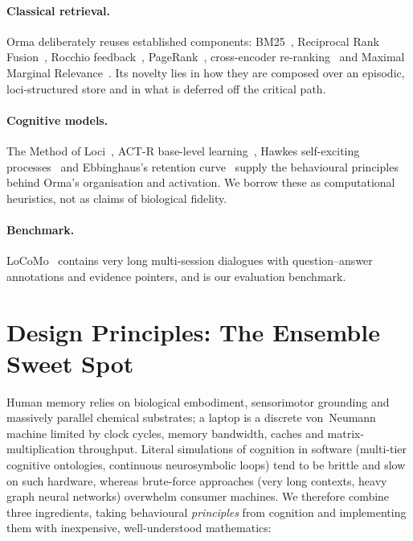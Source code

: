 \documentclass[11pt]{article}
\newcommand{\orma}{\mbox{Orma}}
\begin{document}
\paragraph{Classical retrieval.}
\orma{} deliberately reuses established components: BM25~\cite{robertson2009bm25}, Reciprocal Rank Fusion~\cite{cormack2009rrf}, Rocchio feedback~\cite{rocchio1971relevance}, PageRank~\cite{page1999pagerank}, cross-encoder re-ranking~\cite{nogueira2019passage,jiao2020tinybert} and Maximal Marginal Relevance~\cite{carbonell1998mmr}.
Its novelty lies in how they are composed over an episodic, loci-structured store and in what is deferred off the critical path.

\paragraph{Cognitive models.}
The Method of Loci~\cite{yates1966art}, ACT-R base-level learning~\cite{anderson1998actr}, Hawkes self-exciting processes~\cite{hawkes1971spectra} and Ebbinghaus's retention curve~\cite{ebbinghaus1885memory} supply the behavioural principles behind \orma's organisation and activation. We borrow these as computational heuristics, not as claims of biological fidelity.

\paragraph{Benchmark.}
LoCoMo~\cite{maharana2024locomo} contains very long multi-session dialogues with question--answer annotations and evidence pointers, and is our evaluation benchmark.

\section{Design Principles: The Ensemble Sweet Spot}
\label{sec:principles}

Human memory relies on biological embodiment, sensorimotor grounding and massively parallel chemical substrates; a laptop is a discrete von~Neumann machine limited by clock cycles, memory bandwidth, caches and matrix-multiplication throughput.
Literal simulations of cognition in software (multi-tier cognitive ontologies, continuous neurosymbolic loops) tend to be brittle and slow on such hardware, whereas brute-force approaches (very long contexts, heavy graph neural networks) overwhelm consumer machines.
We therefore combine three ingredients, taking behavioural \emph{principles} from cognition and implementing them with inexpensive, well-understood mathematics:
\end{document}

